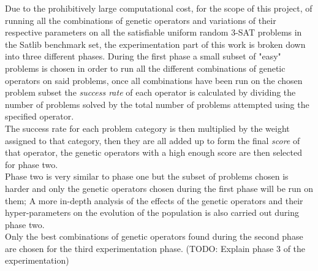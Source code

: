 Due to the prohibitively large computational cost, for the scope of this project, of running all the combinations of genetic operators and variations of their respective parameters on all the satisfiable uniform random 3-SAT problems in the Satlib benchmark set, the experimentation part of this work is broken down into three different phases.
\bigbreak
During the first phase a small subset of "easy" problems is chosen in order to run all the different combinations of genetic operators on said problems, once all combinations have been run on the chosen problem subset the \textit{success rate} of each operator is calculated by dividing the number of problems solved by the total number of problems attempted using the specified operator.
\\The success rate for each problem category is then multiplied by the weight assigned to that category, then they are all added up to form the final \textit{score} of that operator, the genetic operators with a high enough score are then selected for phase two.
\\Phase two is very similar to phase one but the subset of problems chosen is harder and only the genetic operators chosen during the first phase will be run on them; A more in-depth analysis of the effects of the genetic operators and their hyper-parameters on the evolution of the population is also carried out during phase two.
\\Only the best combinations of genetic operators found during the second phase are chosen for the third experimentation phase.
(TODO: Explain phase 3 of the experimentation)


